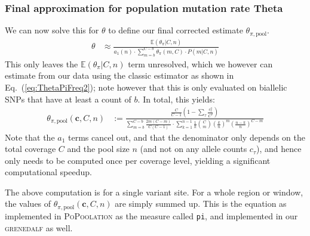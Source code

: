 \documentclass[a4paper,9pt,DIV=14]{scrartcl}
\newcounter{todo}
\newcommand\todo[1]{}
\newcommand\toolname{\textsc}
\newcommand\eqnref[1]{Eq.~(\ref{#1})}
\begin{document}



\subsubsection*{Final approximation for population mutation rate Theta}
\label{supp:sec:ThetaPi:sub:PoolSequencing:sub:FinalApprox}

We can now solve this for $\theta$ to define our final corrected estimate $\theta_{\pi,\text{pool}}$. 
%
\begin{align}
    \label{eq:ThetaPiPoolEstimate}
    \theta &\approx
    \frac{ 
        \mathbb{E}(\theta_\pi|C,n)
    }{ 
        a_1(n) \cdot \sum_{m=b}^{C-b} \theta_\pi(m,C) \cdot P(m|C,n)        
    }
\end{align}
%
This only leaves the $\mathbb{E}(\theta_\pi|C,n)$ term unresolved, %
which we however can estimate from our data using the classic estimator as shown in 
\eqnref{eq:ThetaPiFreq2};
note however that this is only evaluated on biallelic SNPs that have at least a count of $b$.
In total, this yields:
%
\begin{align}
    \label{eq:ThetaPiPool}
    \theta_{\pi,\text{pool}}(\bm{c},C,n) &:=  
    \frac{ 
        \frac{C}{C-1} \left( 1 - \sum_\tau \frac{c_\tau^2}{C^2} \right)
    }{ 
        \sum_{m=b}^{C-b} \frac{2m(C-m)}{C(C-1)} \cdot 
        \sum_{k=1}^{n-1} \frac{1}{k}  {C \choose m} \left(\frac{k}{n}\right)^m \left(\frac{n-k}{n}\right)^{C-m} 
    }
\end{align}
%
Note that the $a_1$ terms cancel out, and 
that the denominator only depends on the total coverage $C$ and the pool size $n$ (and not on any allele counts $c_\tau$),
and hence only needs to be computed once per coverage level, yielding a significant computational speedup.

The above computation is for a single variant site.
For a whole region or window, the values of $\theta_{\pi,\text{pool}}(\bm{c},C,n)$ are simply summed up.
This is the equation as implemented in \toolname{PoPoolation} as the measure called \texttt{pi},
and implemented in our \toolname{grenedalf} as well.
\end{document}
